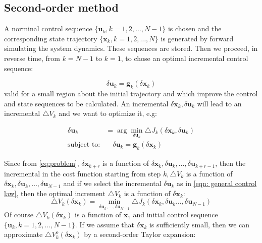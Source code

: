 \subsection{Second-order method}
A norminal control sequence $\{\mathbf{u}_k, k=1,2,\ldots,N-1\}$ is chosen and the corresponding state trajectory $\{\mathbf{x}_k, k=1,2,\ldots,N\}$ is generated by forward simulating the system dynamics. These sequences are stored. Then we proceed, in reverse time, from $k=N-1$ to $k=1$, to chose an optimal incremental control sequence:

\begin{equation}
    \delta \mathbf{u}_k = \mathbf{g}_k(\delta \mathbf{x}_k)
    \label{eqn: general control law}
\end{equation}
valid for a small region about the initial trajectory and which improve the control and state sequences to be calculated. An incremental $\delta \mathbf{x}_k, \delta \mathbf{u}_k$ will lead to an incremental $\triangle V_k$ and we want to optimize it, e.g:

\begin{equation}
    \begin{aligned}
    \delta \mathbf{u}_k &= \arg \min_{\delta \mathbf{u}_k} \triangle J_k(\delta \mathbf{x}_k, \delta \mathbf{u}_k)\\
    \text{subject to:} & \quad \delta \mathbf{u}_k = \mathbf{g}_k(\delta \mathbf{x}_k)
    \end{aligned}
\end{equation}

Since from \ref{eq:problem}, $\delta \mathbf{x}_{k+r}$ is a function of $\delta \mathbf{x}_k, \delta \mathbf{u}_k, \ldots , \delta \mathbf{u}_{k+r-1}$, then the incremental in the cost function starting from step $k, \triangle V_k$ is a function of $\delta \mathbf{x}_k, \delta \mathbf{u}_k, \ldots , \delta \mathbf{u}_{N-1}$ and if we select the incremental $\delta \mathbf{u}_k$ as in \ref{eqn: general control law}, then the optimal increment $\triangle V_k$ is a function of $\delta \mathbf{x}_k$:
\begin{equation}
    \triangle V_k(\delta \mathbf{x}_k) = \min_{\delta \mathbf{u}_k, \ldots, \delta \mathbf{u}_{N-1}} \triangle J_k(\delta \mathbf{x}_k, \delta \mathbf{u}_k \ldots, \delta \mathbf{u}_{N-1})
\end{equation}
Of course $\triangle V_k(\delta \mathbf{x}_k)$ is a function of $\mathbf{x}_1$ and initial control sequence $\{\mathbf{u}_k, k=1,2,\ldots,N-1\}$. If we assume that $\delta \mathbf{x}_k$ is sufficiently small, then we can approximate $\triangle V^o_k(\delta \mathbf{x}_k)$ by a second-order Taylor expansion:

